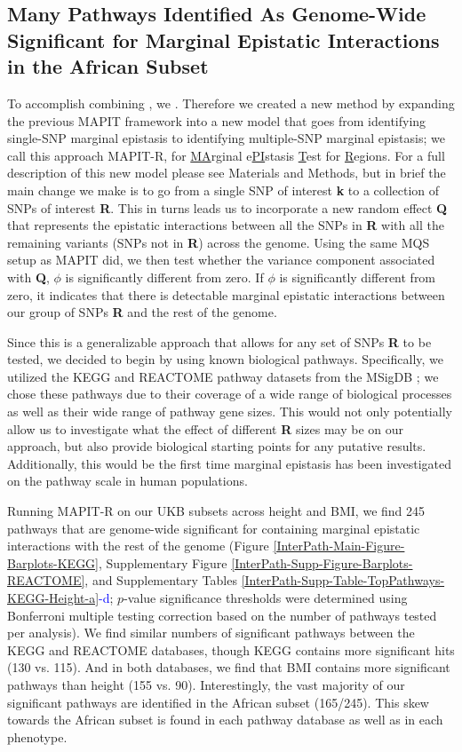\documentclass[12pt,a4paper]{article}
\begin{document}
\subsection{Many Pathways Identified As Genome-Wide Significant for Marginal Epistatic Interactions in the African Subset}\label{InterPath-Results-PathwayEpistasis}

To accomplish combining , we . 
Therefore we created a new method by expanding the previous MAPIT framework into a new model that goes from identifying single-SNP marginal epistasis to identifying multiple-SNP marginal epistasis; we call this approach MAPIT-R, for \underline{MA}rginal e\underline{PI}stasis \underline{T}est for \underline{R}egions. For a full description of this new model please see Materials and Methods, but in brief the main change we make is to go from a single SNP of interest \textbf{k} to a collection of SNPs of interest \textbf{R}. This in turns leads us to incorporate a new random effect  \textbf{Q} that represents the epistatic interactions between all the SNPs in \textbf{R} with all the remaining variants (SNPs not in \textbf{R}) across the genome. Using the same MQS \citep{Zhou2017} setup as MAPIT did, we then test whether the variance component associated with \textbf{Q}, $\phi$ is significantly different from zero. If $\phi$ is significantly different from zero, it indicates that there is detectable marginal epistatic interactions between our group of SNPs \textbf{R} and the rest of the genome.

Since this is a generalizable approach that allows for any set of SNPs \textbf{R} to be tested, we decided to begin by using known biological pathways. Specifically, we utilized the KEGG and REACTOME pathway datasets from the MSigDB \citep{Liberzon2011}; we chose these pathways due to their coverage of a wide range of biological processes as well as their wide range of pathway gene sizes. This would not only potentially allow us to investigate what the effect of different \textbf{R} sizes may be on our approach, but also provide biological starting points for any putative results. Additionally, this would be the first time marginal epistasis has been investigated on the pathway scale in human populations.

Running MAPIT-R on our UKB subsets across height and BMI, we find 245 pathways that are genome-wide significant for containing marginal epistatic interactions with the rest of the genome (Figure \ref{InterPath-Main-Figure-Barplots-KEGG}, Supplementary Figure \ref{InterPath-Supp-Figure-Barplots-REACTOME}, and Supplementary Tables \ref{InterPath-Supp-Table-TopPathways-KEGG-Height-a}\textcolor{blue}{-d}; $p$-value significance thresholds were determined using Bonferroni multiple testing correction based on the number of pathways tested per analysis). We find similar numbers of significant pathways between the KEGG and REACTOME databases, though KEGG contains more significant hits (130 vs. 115). And in both databases, we find that BMI contains more significant pathways than height (155 vs. 90). Interestingly, the vast majority of our significant pathways are identified in the African subset (165/245). This skew towards the African subset is found in each pathway database as well as in each phenotype.   
\end{document}
